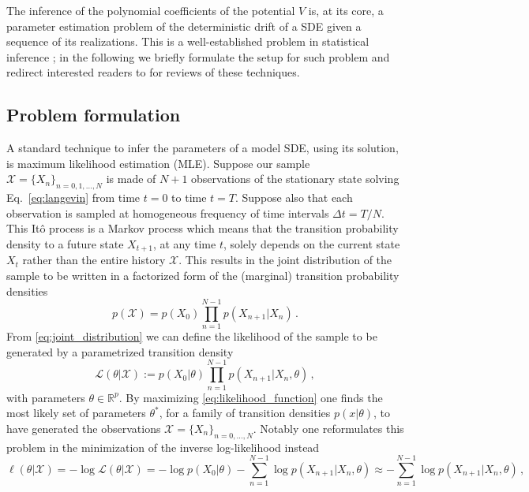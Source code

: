 \documentclass[10pt]{article}
\begin{document}
The inference of the polynomial coefficients of the potential $V$ is, at its core, a parameter estimation problem of the deterministic drift of a SDE given a sequence of its realizations.
This is a well-established problem in statistical inference \cite[Ch. 11, p. 234]{Sarkka2019}; in the following we briefly formulate the setup for such problem and redirect interested readers to \cite{Nielsen2000, Sorensen2004, Craigmile2022} for reviews of these techniques.
%
\subsection{Problem formulation}\label{subsec:formulation}
A standard technique to infer the parameters of a model SDE, using its solution, is maximum likelihood estimation (MLE).
Suppose our sample $\mathcal{X}=\{X_{n}\}_{n=0,1,\dots,N}$ is made of $N+1$ observations of the stationary state solving Eq.~\eqref{eq:langevin} from time $t=0$ to time $t=T$.
Suppose also that each observation is sampled at homogeneous frequency of time intervals $\Delta t = T/N$.
This It\^{o} process is a Markov process \cite[Ch.7, p. 111]{Oksendal2000} which means that the transition probability density to a future state $X_{t+1}$, at any time $t$, solely depends on the current state $X_{t}$ rather than the entire history $\mathcal{X}$.
This results in the joint distribution of the sample to be written in a factorized form of the (marginal) transition probability densities
%
\begin{equation}\label{eq:joint_distribution}
        p(\mathcal{X}) = p(X_{0})\prod_{n=1}^{N-1}p(X_{n+1}|X_{n})\,.
\end{equation}
%
From \eqref{eq:joint_distribution} we can define the likelihood of the sample to be generated by a parametrized transition density 
\begin{equation}\label{eq:likelihood_function}
        \mathcal{L}(\theta|\mathcal{X}) := p(X_{0}|\theta)\prod_{n=1}^{N-1}p(X_{n+1}|X_{n},\theta)\,,
\end{equation}
%
with parameters $\theta\in\mathbb{R}^p$.
By maximizing \eqref{eq:likelihood_function} one finds the most likely set of parameters $\theta^{*}$, for a family of transition densities $p(x|\theta)$, to have generated the observations $\mathcal{X} = \{X_{n}\}_{n=0,\dots,N}$.
Notably one reformulates this problem in the minimization of the inverse log-likelihood instead
%
\begin{equation}\label{eq:inv_log_likelihood}
        \ell(\theta|\mathcal{X}) = -\log\mathcal{L}(\theta|\mathcal{X}) = -\log p(X_{0}|\theta) - \sum_{n=1}^{N-1}\log p(X_{n+1}|X_{n},\theta) \approx -\sum_{n=1}^{N-1}\log p(X_{n+1}|X_{n},\theta) \,,
\end{equation}
\end{document}
